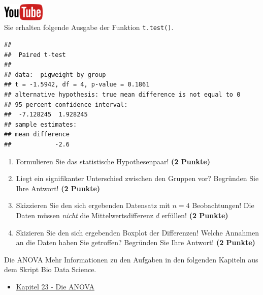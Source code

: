 \documentclass[a4paper, 10pt]{scrartcl}\usepackage[]{graphicx}\usepackage[]{xcolor}
\makeatletter
\newenvironment{kframe}{%
 \def\at@end@of@kframe{}%
 \ifinner\ifhmode%
  \def\at@end@of@kframe{\end{minipage}}%
  \begin{minipage}{\columnwidth}%
 \fi\fi%
 \def\FrameCommand##1{\hskip\@totalleftmargin \hskip-\fboxsep
 \colorbox{shadecolor}{##1}\hskip-\fboxsep
     \hskip-\linewidth \hskip-\@totalleftmargin \hskip\columnwidth}%
 \MakeFramed {\advance\hsize-\width
   \@totalleftmargin\z@ \linewidth\hsize
   \@setminipage}}%
 {\par\unskip\endMakeFramed%
 \at@end@of@kframe}
\newenvironment{knitrout}{}{} %
\makeatother
\begin{document}
\hfill\href{https://youtu.be/kHmfEmU6lrk}{\includegraphics[width =
  2cm]{img/youtube}}\\[1Ex]


Sie erhalten folgende \Rlogo Ausgabe der Funktion \texttt{t.test()}.

\begin{knitrout}
\color{fgcolor}\begin{kframe}
\begin{verbatim}
## 
## 	Paired t-test
## 
## data:  pigweight by group
## t = -1.5942, df = 4, p-value = 0.1861
## alternative hypothesis: true mean difference is not equal to 0
## 95 percent confidence interval:
##  -7.128245  1.928245
## sample estimates:
## mean difference 
##            -2.6
\end{verbatim}
\end{kframe}
\end{knitrout}


\begin{enumerate}
  \item Formulieren Sie das statistische Hypothesenpaar! \textbf{(2
Punkte)}
\item Liegt ein signifikanter Unterschied zwischen den Gruppen vor?
  Begr{\"u}nden Sie Ihre Antwort! \textbf{(2 Punkte)}
\item Skizzieren Sie den sich ergebenden Datensatz mit $n = 4$
  Beobachtungen! Die Daten m{\"u}ssen \textit{nicht} die Mittelwertsdifferenz
  $d$ erf{\"u}llen! \textbf{(2 Punkte)} 
\item Skizieren Sie den sich ergebenden Boxplot der Differenzen! Welche Annahmen an die Daten haben Sie getroffen? Begr{\"u}nden Sie Ihre Antwort! \textbf{(2 Punkte)} 
\end{enumerate}
 
\clearpage
\begin{graybox}{Die ANOVA}
Mehr Informationen zu den Aufgaben in den folgenden Kapiteln aus dem Skript Bio Data Science.
  \begin{itemize}
  \item \href{https://jkruppa.github.io/stat-tests-anova.html}{Kapitel 23 - Die ANOVA}
  \end{itemize}
\end{graybox}
\clearpage
\end{document}
